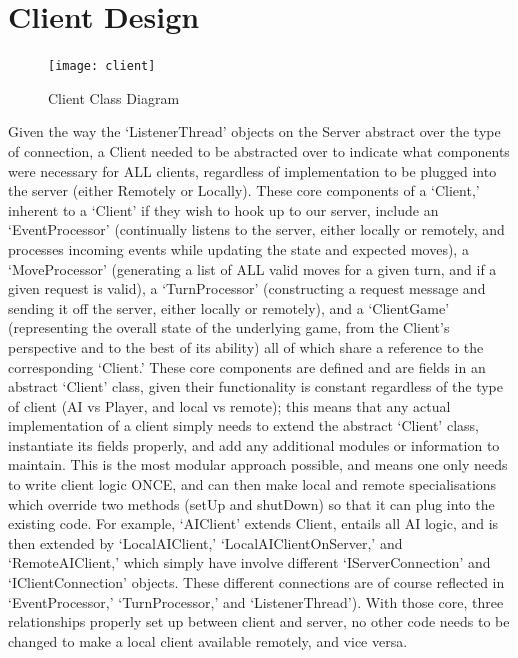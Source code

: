 \documentclass[a4paper,doc,draftfirst]{apa6}
\begin{document}
\section{Client Design}
\begin{figure}[hbtp]
      \texttt{[image: client]}
      \caption{Client Class Diagram}
\end{figure}
Given the way the ‘ListenerThread’ objects on the Server abstract over the type of connection, a Client needed to be abstracted over to indicate what components were necessary for ALL clients, regardless of implementation to be plugged into the server (either Remotely or Locally). These core components of a ‘Client,’ inherent to a ‘Client’ if they wish to hook up to our server, include an ‘EventProcessor’ (continually listens to the server, either locally or remotely, and processes incoming events while updating the state and expected moves), a ‘MoveProcessor’ (generating a list of ALL valid moves for a given turn, and if a given request is valid), a ‘TurnProcessor’ (constructing a request message and sending it off the server, either locally or remotely), and a ‘ClientGame’ (representing the overall state of the underlying game, from the Client’s perspective and to the best of its ability) all of which share a reference to the corresponding ‘Client.’ These core components are defined and are fields in an abstract ‘Client’ class, given their functionality is constant regardless of the type of client (AI vs Player, and local vs remote); this means that any actual implementation of a client simply needs to extend the abstract ‘Client’ class, instantiate its fields properly, and add any additional modules or information to maintain. This is the most modular approach possible, and means one only needs to write client logic ONCE, and can then make local and remote specialisations which override two methods (setUp and shutDown) so that it can plug into the existing code. For example, ‘AIClient’ extends Client, entails all AI logic, and is then extended by ‘LocalAIClient,’ ‘LocalAIClientOnServer,’ and ‘RemoteAIClient,’ which simply have involve different ‘IServerConnection’ and ‘IClientConnection’ objects. These different connections are of course reflected in ‘EventProcessor,’ ‘TurnProcessor,’ and ‘ListenerThread’). With those core, three relationships properly set up between client and server, no other code needs to be changed to make a local client available remotely, and vice versa.
\end{document}
